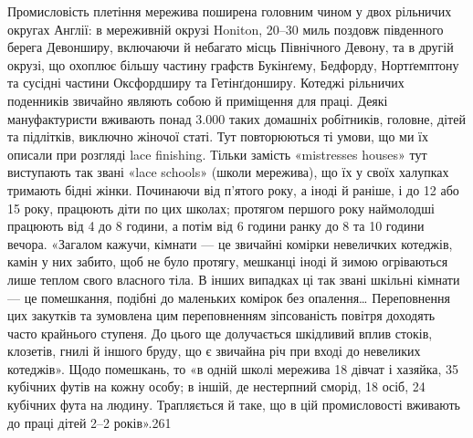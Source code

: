 Промисловість плетіння мережива поширена головним чином
у двох рільничих округах Англії: в мереживній окрузі Honiton,
20--30 миль поздовж південного берега Девонширу, включаючи
й небагато місць Північного Девону, та в другій окрузі, що
охоплює більшу частину графств Букінґему, Бедфорду, Нортґемптону
та сусідні частини Оксфордширу та Гетінґдонширу.
Котеджі рільничих поденників звичайно являють собою й приміщення
для праці. Деякі мануфактуристи вживають понад
3.000 таких домашніх робітників, головне, дітей та підлітків,
виключно жіночої статі. Тут повторюються ті умови, що ми їх
описали при розгляді lace finishing. Тільки замість «mistresses
houses» тут виступають так звані «lace schools» (школи мережива),
що їх у своїх халупках тримають бідні жінки. Починаючи від
п’ятого року, а іноді й раніше, і до 12 або 15 року, працюють
діти по цих школах; протягом першого року наймолодші працюють
від 4 до 8 години, а потім від 6 години ранку до 8 та 10 години
вечора. «Загалом кажучи, кімнати — це звичайні комірки невеличких
котеджів, камін у них забито, щоб не було протягу, мешканці
іноді й зимою огріваються лише теплом свого власного
тіла. В інших випадках ці так звані шкільні кімнати — це помешкання,
подібні до маленьких комірок без опалення\dots{} Переповнення
цих закутків та зумовлена цим переповненням зіпсованість
повітря доходять часто крайнього ступеня. До цього ще
долучається шкідливий вплив стоків, клозетів, гнилі й іншого
бруду, що є звичайна річ при вході до невеликих котеджів». Щодо
помешкань, то «в одній школі мережива 18 дівчат і хазяйка,
35 кубічних футів на кожну особу; в іншій, де нестерпний сморід,
18 осіб, 24 кубічних фута на людину. Трапляється й таке, що
в цій промисловості вживають до праці дітей 2--2 років».261

